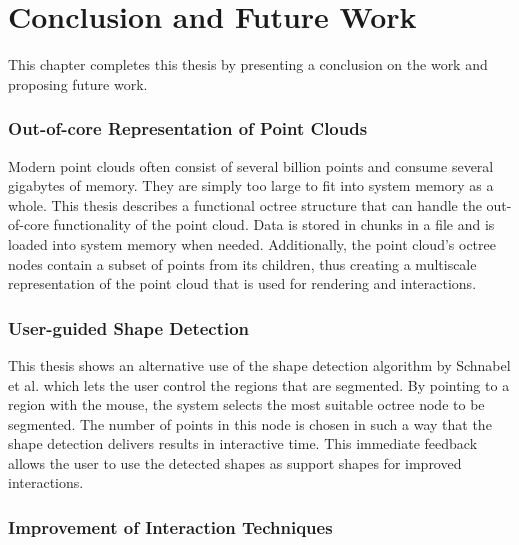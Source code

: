 \chapter{Conclusion and Future Work}
\label{chap:conclusion}


This chapter completes this thesis by presenting a conclusion on the work and proposing future work.

\subsection{Out-of-core Representation of Point Clouds}

Modern point clouds often consist of several billion points and consume several gigabytes of memory. They are simply too large to fit into system memory as a whole. This thesis describes a functional octree structure that can handle the out-of-core functionality of the point cloud. Data is stored in chunks in a file and is loaded into system memory when needed. Additionally, the point cloud's octree nodes contain a subset of points from its children, thus creating a multiscale representation of the point cloud that is used for rendering and interactions. 


\subsection{User-guided Shape Detection}

This thesis shows an alternative use of the shape detection algorithm by Schnabel et al. \cite{schnabel-2007-efficient} which lets the user control the regions that are segmented. By pointing to a region with the mouse, the system selects the most suitable octree node to be segmented. The number of points in this node is chosen in such a way that the shape detection delivers results in interactive time. This immediate feedback allows the user to use the detected shapes as support shapes for improved interactions. 


\subsection{Improvement of Interaction Techniques}

